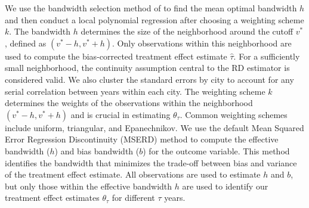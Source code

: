 We use the bandwidth selection method of \cite{calonico2019regression} to find the mean optimal bandwidth $h$ and then conduct a local polynomial regression after choosing a weighting scheme $k$. The bandwidth $h$ determines the size of the neighborhood around the cutoff $v^*$, defined as $(v^* - h, v^* + h)$. Only observations within this neighborhood are used to compute the bias-corrected treatment effect estimate $\hat{\tau}$. For a sufficiently small neighborhood, the continuity assumption central to the RD estimator is considered valid. We also cluster the standard errors by city to account for any serial correlation between years within each city. The weighting scheme $k$ determines the weights of the observations within the neighborhood $(v^* - h, v^* + h)$ and is crucial in estimating $\theta_{\tau}$. Common weighting schemes include uniform, triangular, and Epanechnikov. We use the default Mean Squared Error Regression Discontinuity (MSERD) method to compute the effective bandwidth ($h$) and bias bandwidth ($b$) for the outcome variable. This method identifies the bandwidth that minimizes the trade-off between bias and variance of the treatment effect estimate. All observations are used to estimate $h$ and $b$, but only those within the effective bandwidth $h$ are used to identify our treatment effect estimates $\theta_\tau$ for different $\tau$ years.

